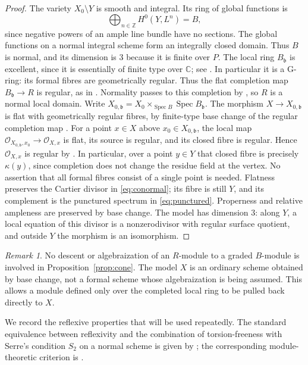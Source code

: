 \documentclass[11pt,reqno]{amsart}
\numberwithin{equation}{section}
\theoremstyle{definition}
\theoremstyle{remark}
\newtheorem{remark}[theorem]{Remark}
\newcommand{\C}{\mathbb C}
\newcommand{\Z}{\mathbb Z}
\newcommand{\OO}{\mathcal O}
\newcommand{\bb}{\mathfrak b}
\newcommand{\Spec}{\operatorname{Spec}}
\begin{document}
\begin{proof}
The variety $X_0\setminus Y$ is smooth and integral. Its ring of global
functions is
\[
 \bigoplus_{n\in\Z}H^0(Y,L^n)=B,
\]
since negative powers of an ample line bundle have no sections.
The global functions on a normal integral scheme form an integrally
closed domain. Thus $B$ is normal, and its dimension is $3$ because
it is finite over $P$. The local ring $B_\bb$ is excellent, since it is
essentially of finite type over $\C$; see
\cite[Tags 07QU and 07QW]{Stacks}. In particular it is a G-ring:
its formal fibres are geometrically regular. Thus the flat completion
map $B_\bb\to R$ is regular, as in \cite[Tag 0AH2]{Stacks}.
Normality passes to this completion by \cite[Tag 0C23]{Stacks},
so $R$ is a normal local domain. Write
$X_{0,\bb}=X_0\times_{\Spec B}\Spec B_\bb$.
The morphism $X\to X_{0,\bb}$ is flat with geometrically regular
fibres, by finite-type base change of the regular completion map
\cite[Tag 07C1]{Stacks}. For a point $x\in X$ above $x_0\in X_{0,\bb}$,
the local map $\OO_{X_{0,\bb},x_0}\to\OO_{X,x}$ is flat, its source
is regular, and its closed fibre is regular. Hence $\OO_{X,x}$ is
regular by \cite[Tag 031E]{Stacks}. In particular, over a point
$y\in Y$ that closed fibre is precisely $\kappa(y)$, since completion
does not change the residue field at the vertex. No assertion that
all formal fibres consist of a single point is needed.
Flatness preserves the Cartier divisor in \eqref{eq:conormal}; its fibre is
still $Y$, and its complement is the punctured spectrum in
\eqref{eq:punctured}. Properness and relative ampleness are preserved
by base change. The model has dimension $3$: along $Y$, a local
equation of this divisor is a nonzerodivisor with regular surface
quotient, and outside $Y$ the morphism is an isomorphism.
\end{proof}

\begin{remark}\label{rem:completion}
No descent or algebraization of an $R$-module to a graded $B$-module is
involved in Proposition~\ref{prop:cone}. The model $X$ is an ordinary
scheme obtained by base change, not a formal scheme whose algebraization
is being assumed. This allows a module defined only over the completed
local ring to be pulled back directly to $X$.
\end{remark}

We record the reflexive properties that will be used repeatedly.
The standard equivalence between reflexivity and the combination of
torsion-freeness with Serre's condition $S_2$ on a normal scheme is
given by \cite[Tag 0AY6]{Stacks}; the corresponding module-theoretic
criterion is \cite[Tag 0AVB]{Stacks}.
\end{document}
